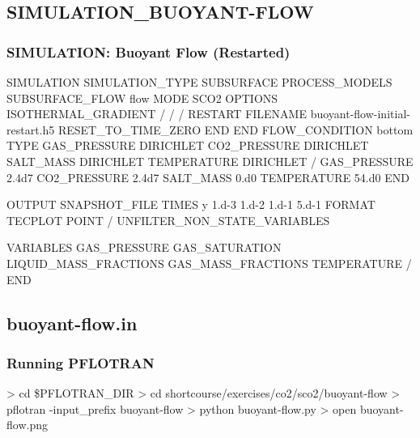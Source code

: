 \documentclass{beamer}
\newcommand\redcomment[1]{{{\color{red} #1}}}
\begin{document}
\subsection{SIMULATION\_BUOYANT-FLOW}

\begin{frame}\frametitle{SIMULATION: Buoyant Flow (Restarted)}

\begin{semiverbatim}
SIMULATION
  SIMULATION_TYPE SUBSURFACE
  PROCESS_MODELS
    SUBSURFACE_FLOW flow
      MODE SCO2
      \redcomment{OPTIONS}
        \redcomment{ISOTHERMAL_GRADIENT}
      \redcomment{/}
    /
  /
\redcomment{  RESTART}
  \redcomment{  FILENAME buoyant-flow-initial-restart.h5}
  \redcomment{  RESET_TO_TIME_ZERO}
\redcomment{  END}
END
\newpage
\redcomment{FLOW_CONDITION bottom}
  \redcomment{TYPE}
    \redcomment{GAS_PRESSURE DIRICHLET}
    \redcomment{CO2_PRESSURE DIRICHLET}
    \redcomment{SALT_MASS DIRICHLET}
    \redcomment{TEMPERATURE DIRICHLET}
  \redcomment{/}
  \redcomment{GAS_PRESSURE 2.4d7}
  \redcomment{CO2_PRESSURE 2.4d7}
  \redcomment{SALT_MASS 0.d0}
  \redcomment{TEMPERATURE 54.d0}
\redcomment{END}

\newpage
\redcomment{OUTPUT}
  \redcomment{SNAPSHOT_FILE}
    \redcomment{TIMES y 1.d-3 1.d-2 1.d-1 5.d-1}
    \redcomment{FORMAT TECPLOT POINT}
  \redcomment{/}
  \redcomment{UNFILTER_NON_STATE_VARIABLES}

  \redcomment{VARIABLES}
   \redcomment{GAS_PRESSURE}
   \redcomment{GAS_SATURATION}
   \redcomment{LIQUID_MASS_FRACTIONS}
   \redcomment{GAS_MASS_FRACTIONS}
   \redcomment{TEMPERATURE}
  \redcomment{/}
\redcomment{END}
\end{semiverbatim}

\end{frame}
\subsection{buoyant-flow.in}

\begin{frame}[fragile]\frametitle{Running PFLOTRAN}

\begin{semiverbatim}

> cd \$PFLOTRAN_DIR
> cd shortcourse/exercises/co2/sco2/buoyant-flow
> pflotran -input_prefix buoyant-flow
> python buoyant-flow.py
> open buoyant-flow.png
\end{semiverbatim}

\end{frame}
\end{document}
